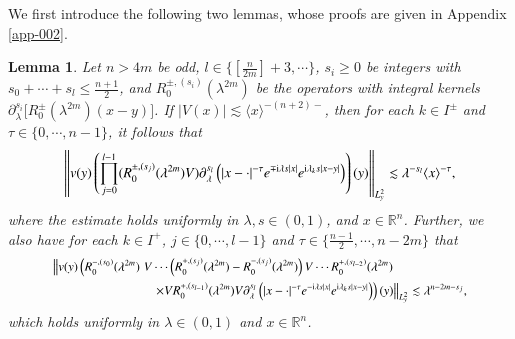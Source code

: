 \documentclass[11pt,reqno]{amsart}
\def\i{{\rm i}}
\newtheorem{lemma}[theorem]{Lemma}
\numberwithin{equation}{section}
\theoremstyle{definition}
\begin{document}
We first introduce the following two lemmas, whose proofs are given in Appendix \ref{app-002}.
\begin{lemma}\label{lemma4.6}
	Let $n>4m$ be odd, $l\in\{[\frac{n}{2m}]+3,\cdots\}$, $s_{i}\geq 0$ be integers with $s_0+\cdots+s_{l}\leq \frac{n+1}{2}$, and $R_{0}^{\pm,(s_{i})}(\lambda^{2m})$ be the operators with integral kernels $\partial_{\lambda}^{s_{i}}\big[R_{0}^{\pm}(\lambda^{2m})(x-y)\big]$.
	If $|V(x)|\lesssim\langle x\rangle^{-(n+2)-}$, then for each $k\in I^\pm$ and $\tau\in\{0,\cdots,n-1\}$, it follows that
	{\small
		\begin{equation}\label{eq4.53.1}
			\left\|v(y) \left(\prod_{j=0}^{l-1}(R_{0}^{\pm,(s_{j})}(\lambda^{2m})V)\partial_\lambda^{s_l}\left(|x-\cdot|^{-\tau}e^{\mp \i\lambda s|x|}e^{\i\lambda_{k}s|x-y|}  \right)\right)(y)\right\|_{L^2_y} \lesssim \lambda^{-s_l}\langle x\rangle^{-\tau},
		\end{equation}
	}where the estimate holds uniformly in $\lambda,s\in(0,1)$, and $x\in\mathbb{R}^n$. Further,
	we also have for each $k\in I^+$, $j\in\{0,\cdots,l-1\}$ and $\tau\in\{\frac{n-1}{2},\cdots,n-2m\}$ that
	\begin{equation}\label{eq4.53.2}
		{\small
			\begin{aligned}
				\big\|  v(y)\left(R_{0}^{-,(s_{0})}(\lambda^{2m})
				\right. V& \cdots  \left(R_{0}^{+,(s_{j})}(\lambda^{2m})-R_{0}^{-,(s_{j})}(\lambda^{2m})\right)V
				\cdots R_{0}^{+,(s_{l-2})}(\lambda^{2m}) \\
				&\left.
				\times VR_{0}^{+,(s_{l-1})}(\lambda^{2m})V\partial_\lambda^{s_l}\left(|x-\cdot|^{-\tau}e^{-\i\lambda s|x|}e^{\i\lambda_{k}s|x-y|}  \right)\right)(y)\big\|_{L^2_y}\lesssim{\lambda^{n-2m-s_j}},
			\end{aligned}
		}
	\end{equation}
	which holds uniformly in $\lambda\in(0,1)$ and $x\in\mathbb{R}^n$.
\end{lemma}
\end{document}
